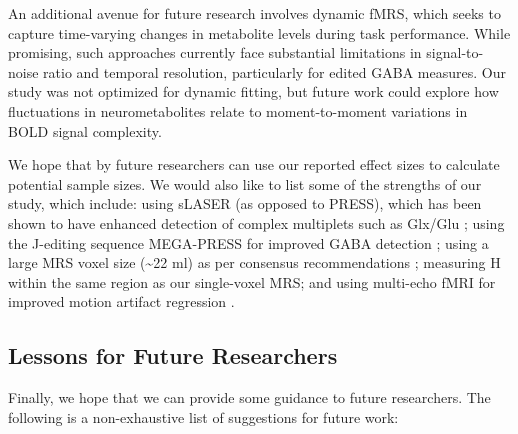 \documentclass[
true
]{sn-jnl}
\begin{document}
An additional avenue for future research involves dynamic fMRS, which
seeks to capture time-varying changes in metabolite levels during task
performance. While promising, such approaches currently face substantial
limitations in signal-to-noise ratio and temporal resolution,
particularly for edited GABA measures. Our study was not optimized for
dynamic fitting, but future work could explore how fluctuations in
neurometabolites relate to moment-to-moment variations in BOLD signal
complexity.

We hope that by future researchers can use our reported effect sizes to
calculate potential sample sizes. We would also like to list some of the
strengths of our study, which include: using sLASER (as opposed to
PRESS), which has been shown to have enhanced detection of complex
multiplets such as Glx/Glu
\citep{wilsonMethodologicalConsensusClinical2019}; using the J-editing
sequence MEGA-PRESS for improved GABA detection
\citep{peekComprehensiveGuideMEGAPRESS2023}; using a large MRS voxel
size (\textasciitilde22 ml) as per consensus recommendations
\citep{peekBrainGABAGlutamate2020, choiSpectralEditing1H2021, linMinimumReportingStandards2021};
measuring H within the same region as our single-voxel MRS; and using
multi-echo fMRI for improved motion artifact regression
\citep{kunduMultiechoFMRIReview2017}.

\subsection{Lessons for Future
Researchers}\label{lessons-for-future-researchers}

Finally, we hope that we can provide some guidance to future
researchers. The following is a non-exhaustive list of suggestions for
future work:
\end{document}
